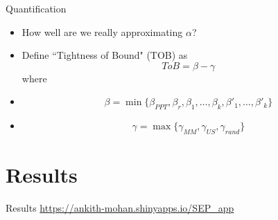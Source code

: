 \documentclass{beamer}
\begin{document}
	\begin{frame}{Quantification}
		\begin{itemize}
			\item[] How well are we really approximating $\alpha$?
			\item[] Define ``Tightness of Bound" (TOB) as
						$$
							ToB = \beta - \gamma
						$$
						where
						\item[] 
							$$
								\beta = \min \{ \beta_{PPT}, \beta_r, \beta_1, \dots, \beta_k, \beta'_1, \dots, \beta'_k \}
                				$$
                			\item[]
                				$$
                    				\gamma = \max \{ \gamma_{MM}, \gamma_{US}, \gamma_{rand} \}
                				$$
		\end{itemize}
	\end{frame}

\section{Results}
	\begin{frame}{Results}
		\url{https://ankith-mohan.shinyapps.io/SEP_app}
	\end{frame}
            


    
\end{document}
